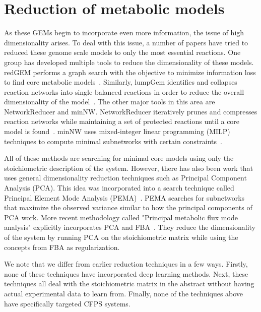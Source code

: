 
\section{Reduction of metabolic models}
As these GEMs begin to incorporate even more information, the issue of high dimensionality arises.
To deal with this issue, a number of papers have tried to reduced these genome scale models to only the most essential reactions.
One group has developed multiple tools to reduce the dimensionality of these models.
redGEM performs a graph search with the objective to minimize information loss to find core metabolic models~\cite{ataman2017redgem}.
Similarly, lumpGem identifies and collapses reaction networks into single balanced reactions in order to reduce the overall dimensionality of the model~\cite{ataman2017lumpgem}.
The other major tools in this area are NetworkReducer and minNW.
NetworkReducer iteratively prunes and compresses reaction networks while maintaining a set of protected reactions until a core model is found~\cite{erdrich2015algorithm}.
minNW uses mixed-integer linear programming (MILP) techniques to compute minimal subnetworks with certain constraints~\cite{rohl2017mixed}.

All of these methods are searching for minimal core models using only the stoichiometric description of the system.
However, there has also been work that uses general dimensionality reduction techniques such as Principal Component Analysis (PCA).
This idea was incorporated into a search technique called Principal Element Mode Analysis (PEMA)~\cite{von2016principal}.
PEMA searches for subnetworks that maximize the observed variance similar to how the principal components of PCA work.
More recent methodology called "Principal metabolic flux mode analysis" explicitly incorporates PCA and FBA~\cite{bhadra2017principal}.
They reduce the dimensionality of the system by running PCA on the stoichiometric matrix while using the concepts from FBA as regularization.

We note that we differ from earlier reduction techniques in a few ways.
Firstly, none of these techniques have incorporated deep learning methods.
Next, these techniques all deal with the stoichiometric matrix in the abstract without having actual experimental data to learn from.
Finally, none of the techniques above have specifically targeted CFPS systems.

